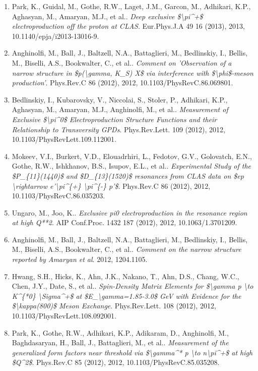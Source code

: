 \begin{enumerate}
\item Park, K., Guidal, M., Gothe, R.W., Laget, J.M., Garcon, M., Adhikari, K.P., Aghasyan, M., Amaryan, M.J., et al.. \textit{Deep exclusive \$\textbackslash{}pi\textasciicircum{}+\$ electroproduction off the proton at CLAS}. Eur.Phys.J.A 49 16 (2013), 2013, 10.1140/epja/i2013-13016-9.
\item Anghinolfi, M., Ball, J., Baltzell, N.A., Battaglieri, M., Bedlinskiy, I., Bellis, M., Biselli, A.S., Bookwalter, C., et al.. \textit{Comment on 'Observation of a narrow structure in \$p(\textbackslash{}gamma, K\_S) X\$ via interference with \$\textbackslash{}phi\$-meson production'}. Phys.Rev.C 86 (2012), 2012, 10.1103/PhysRevC.86.069801.
\item Bedlinskiy, I., Kubarovsky, V., Niccolai, S., Stoler, P., Adhikari, K.P., Aghasyan, M., Amaryan, M.J., Anghinolfi, M., et al.. \textit{Measurement of Exclusive \$\textbackslash{}pi\textasciicircum{}0\$ Electroproduction Structure Functions and their Relationship to Transversity GPDs}. Phys.Rev.Lett. 109 (2012), 2012, 10.1103/PhysRevLett.109.112001.
\item Mokeev, V.I., Burkert, V.D., Elouadrhiri, L., Fedotov, G.V., Golovatch, E.N., Gothe, R.W., Ishkhanov, B.S., Isupov, E.L., et al.. \textit{Experimental Study of the \$P\_\{11\}(1440)\$ and \$D\_\{13\}(1520)\$ resonances from CLAS data on \$ep \textbackslash{}rightarrow e'\textbackslash{}pi\textasciicircum{}\{+\} \textbackslash{}pi\textasciicircum{}\{-\} p'\$}. Phys.Rev.C 86 (2012), 2012, 10.1103/PhysRevC.86.035203.
\item Ungaro, M., Joo, K.. \textit{Exclusive pi0 electroproduction in the resonance region at high Q**2}. AIP Conf.Proc. 1432 187 (2012), 2012, 10.1063/1.3701209.
\item Anghinolfi, M., Ball, J., Baltzell, N.A., Battaglieri, M., Bedlinskiy, I., Bellis, M., Biselli, A.S., Bookwalter, C., et al.. \textit{Comment on the narrow structure reported by Amaryan et al}. 2012, 1204.1105.
\item Hwang, S.H., Hicks, K., Ahn, J.K., Nakano, T., Ahn, D.S., Chang, W.C., Chen, J.Y., Date, S., et al.. \textit{Spin-Density Matrix Elements for \$\textbackslash{}gamma p \textbackslash{}to K\textasciicircum{}\{*0\} \textbackslash{}Sigma\textasciicircum{}+\$ at \$E\_\textbackslash{}gamma=1.85-3.0\$ GeV with Evidence for the \$\textbackslash{}kappa(800)\$ Meson Exchange}. Phys.Rev.Lett. 108 (2012), 2012, 10.1103/PhysRevLett.108.092001.
\item Park, K., Gothe, R.W., Adhikari, K.P., Adikaram, D., Anghinolfi, M., Baghdasaryan, H., Ball, J., Battaglieri, M., et al.. \textit{Measurement of the generalized form factors near threshold via \$\textbackslash{}gamma\textasciicircum{}* p \textbackslash{}to n\textbackslash{}pi\textasciicircum{}+\$ at high \$Q\textasciicircum{}2\$}. Phys.Rev.C 85 (2012), 2012, 10.1103/PhysRevC.85.035208.

\end{enumerate}

